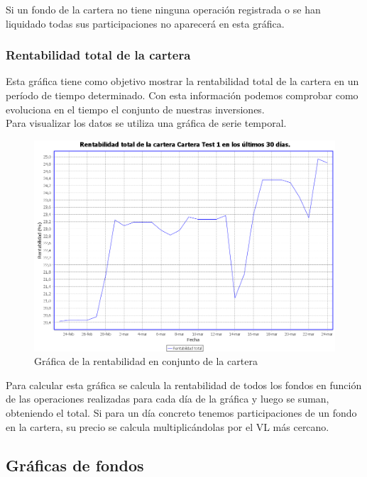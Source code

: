 \documentclass[12pt, a4paper]{article}
\begin{document}
Si un fondo de la cartera no tiene ninguna operación registrada o se han liquidado todas sus participaciones no aparecerá en esta gráfica.

\newpage

\subsubsection{Rentabilidad total de la cartera}

Esta gráfica tiene como objetivo mostrar la rentabilidad total de la cartera en un período de tiempo determinado. Con esta información podemos comprobar como evoluciona en el tiempo el conjunto de nuestras inversiones.\\

Para visualizar los datos se utiliza una gráfica de serie temporal.

	\begin{figure}[htbp]
	\centering
	\includegraphics[width=\textwidth]{figuras/renttotal.PNG}
	\caption{Gráfica de la rentabilidad en conjunto de la cartera}
	\label{fig:renttotal}
	\end {figure}


Para calcular esta gráfica se calcula la rentabilidad de todos los fondos en función de las operaciones realizadas para cada día de la gráfica y luego se suman, obteniendo el total. Si para un día concreto tenemos participaciones de un fondo en la cartera, su precio se calcula multiplicándolas por el \gls{VL} más cercano.
\newpage

\subsection{Gráficas de fondos}
\end{document}
